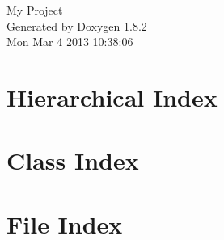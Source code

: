 \documentclass{book}
\begin{document}
\hypersetup{pageanchor=false,citecolor=blue}
\begin{titlepage}
\vspace*{7cm}
\begin{center}
{\Large My Project }\\
\vspace*{1cm}
{\large Generated by Doxygen 1.8.2}\\
\vspace*{0.5cm}
{\small Mon Mar 4 2013 10:38:06}\\
\end{center}
\end{titlepage}
\clearemptydoublepage
{}
\tableofcontents
\clearemptydoublepage
{}
\hypersetup{pageanchor=true,citecolor=blue}
\chapter{Hierarchical Index}

\chapter{Class Index}

\chapter{File Index}

\end{document}
